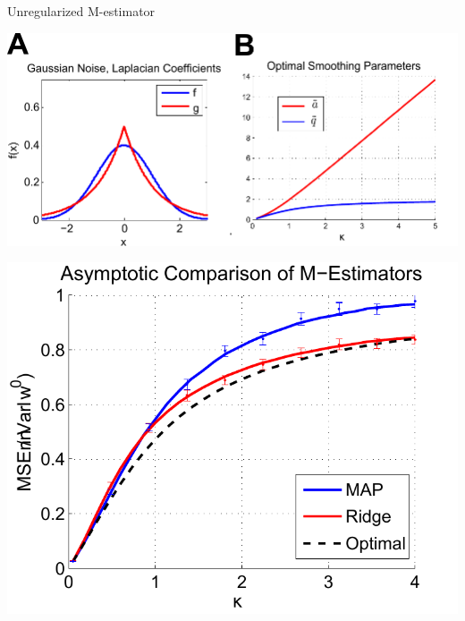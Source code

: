 \documentclass[pdf]{beamer}
\begin{document}
\begin{frame}{Unregularized M-estimator}


        \begin{center}
            \includegraphics[width = .5\linewidth]{regularizedPlots.pdf}
        \end{center}


        \begin{center}
            \includegraphics[width = .5\linewidth]{CompareM_est_redo.pdf}
        \end{center}
\end{frame}
\end{document}
